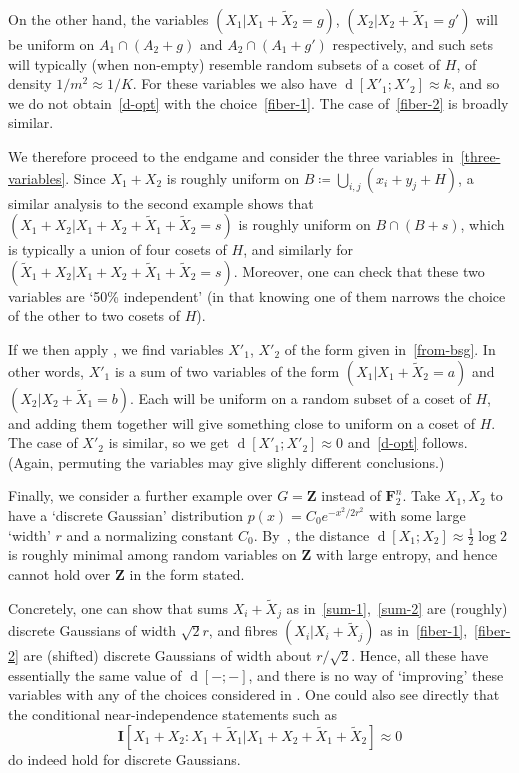 \documentclass[12pt,reqno,tbtags]{amsart}
\theoremstyle{definition}
\theoremstyle{remark}
\def\F{\mathbf{F}}
\def\Z{\mathbf{Z}}
\newcommand{\I}[1]{\mathbf{I}[#1]}
\newcommand{\dist}[2]{{\operatorname{d}[#1;#2]}} %
\numberwithin{equation}{section}
\begin{document}
On the other hand, the variables $(X_1 | X_1 + \tilde X_2 = g)$, $(X_2 | X_2 + \tilde X_1 = g')$ will be uniform on $A_1 \cap (A_2 + g)$ and $A_2 \cap (A_1+g')$ respectively, and such sets will typically (when non-empty) resemble random subsets of a coset of $H$, of density $1/m^2 \approx 1/K$. For these variables we also have $\dist{X'_1}{X'_2} \approx k$, and so we do not obtain~\eqref{d-opt} with the choice~\eqref{fiber-1}. The case of~\eqref{fiber-2} is broadly similar.

We therefore proceed to the endgame and consider the three variables in~\eqref{three-variables}.
Since $X_1+X_2$ is roughly uniform on $B \coloneqq \bigcup_{i,j} (x_i+y_j+H)$, a similar analysis to the second example shows that $(X_1+X_2 | X_1+X_2+\tilde X_1 + \tilde X_2 = s)$ is roughly uniform on $B \cap (B+s)$, which is typically a union of four cosets of $H$, and similarly for $(\tilde X_1+X_2 | X_1+X_2+\tilde X_1 + \tilde X_2 = s)$.
Moreover, one can check that these two variables are `50\% independent' (in that knowing one of them narrows the choice of the other to two cosets of $H$).

If we then apply , we find variables $X'_1$, $X'_2$ of the form given in~\eqref{from-bsg}.
In other words, $X'_1$ is a sum of two variables of the form $(X_1 | X_1 + \tilde X_2 = a)$ and $(X_2 | X_2 + \tilde X_1 = b)$.  Each will be uniform on a random subset of a coset of $H$, and adding them together will give something close to uniform on a coset of $H$.  The case of $X'_2$ is similar, so we get $\dist{X'_1}{X'_2} \approx 0$ and~\eqref{d-opt} follows.
(Again, permuting the variables may give slighly different conclusions.)

Finally, we consider a further example over $G = \Z$ instead of $\F_2^n$.
Take $X_1,X_2$ to have a `discrete Gaussian' distribution $p(x) = C_0 e^{-x^2/2r^2}$ with some large `width' $r$ and a normalizing constant $C_0$.
By~\cite[Theorem~1.13]{tao-entropy}, the distance $\dist{X_1}{X_2} \approx \frac12 \log 2$ is roughly minimal among random variables on $\Z$ with large entropy, and hence  cannot hold over $\Z$ in the form stated.

Concretely, one can show that sums $X_i+\tilde X_j$ as in~\eqref{sum-1},~\eqref{sum-2} are (roughly) discrete Gaussians of width $\sqrt2r$, and fibres $(X_i | X_i+\tilde X_j)$ as in~\eqref{fiber-1},~\eqref{fiber-2} are (shifted) discrete Gaussians of width about $r/\sqrt2$. Hence, all these have essentially the same value of $\dist{-}{-}$, and there is no way of `improving' these variables with any of the choices considered in .
One could also see directly that the conditional near-independence statements such as
\[
  \I{X_1+X_2 : X_1 + \tilde X_1 | X_1+X_2+\tilde X_1 + \tilde X_2} \approx 0
\]
do indeed hold for discrete Gaussians.
\end{document}
